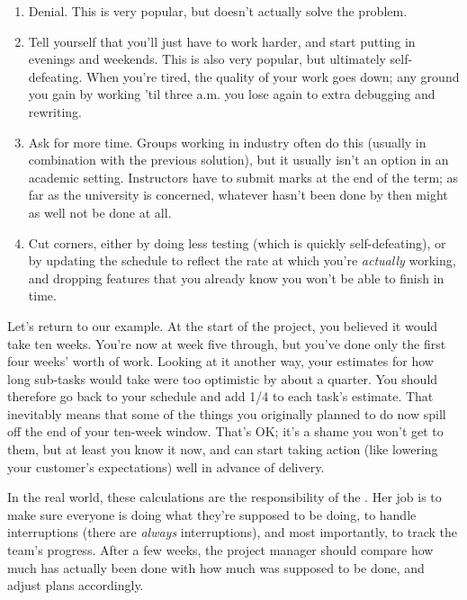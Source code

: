 \documentclass{report}
\begin{document}
\begin{enumerate}

  \item Denial.  This is very popular, but doesn't actually solve the
  problem.

  \item Tell yourself that you'll just have to work harder, and start
  putting in evenings and weekends.  This is also very popular, but
  ultimately self-defeating.  When you're tired, the quality of your
  work goes down; any ground you gain by working 'til three a.m. you
  lose again to extra debugging and rewriting.

  \item Ask for more time.  Groups working in industry often do this
  (usually in combination with the previous solution), but it usually
  isn't an option in an academic setting.  Instructors have to submit
  marks at the end of the term; as far as the university is concerned,
  whatever hasn't been done by then might as well not be done at all.

  \item Cut corners, either by doing less testing (which is quickly
  self-defeating), or by updating the schedule to reflect the rate at
  which you're \emph{actually} working, and dropping features that you
  already know you won't be able to finish in time.

\end{enumerate}

Let's return to our example.  At the start of the project, you
believed it would take ten weeks.  You're now at week five through,
but you've done only the first four weeks' worth of work.  Looking at
it another way, your estimates for how long sub-tasks would take were
too optimistic by about a quarter.  You should therefore go back to
your schedule and add 1/4 to each task's estimate.  That inevitably
means that some of the things you originally planned to do now spill
off the end of your ten-week window.  That's OK; it's a shame you
won't get to them, but at least you know it now, and can start taking
action (like lowering your customer's expectations) well in advance of
delivery.

In the real world, these calculations are the responsibility of the
.  Her job is to make sure everyone is doing
what they're supposed to be doing, to handle interruptions (there are
\emph{always} interruptions), and most importantly, to track the
team's progress.  After a few weeks, the project manager should
compare how much has actually been done with how much was supposed to
be done, and adjust plans accordingly.
\end{document}
